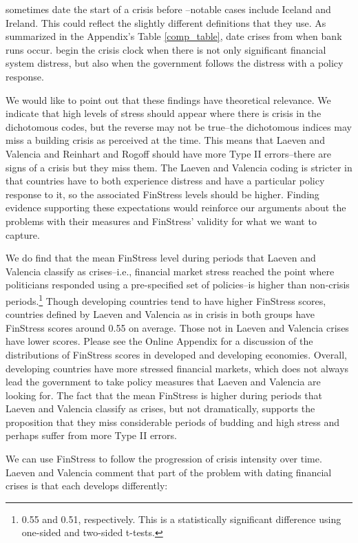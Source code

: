\documentclass[]{article}
\begin{document}
\cite{Reinhart2009} sometimes date the start of a crisis before \cite{laeven2013}--notable cases include Iceland and Ireland. This could reflect the slightly different definitions that they use. As summarized in the Appendix's Table \ref{comp_table}, \cite{Reinhart2009} date crises from when bank runs occur. \cite{laeven2013} begin the crisis clock when there is not only significant financial system distress, but also when the government follows the distress with a policy response.

We would like to point out that these findings have theoretical relevance. We indicate that high levels of stress should appear where there is crisis in the dichotomous codes, but the reverse may not be true--the dichotomous indices may miss a building crisis as perceived at the time. This means that Laeven and Valencia and Reinhart and Rogoff should have more Type II errors--there are signs of a crisis but they miss them. The Laeven and Valencia coding is stricter in that countries have to both experience distress and have a particular policy response to it, so the associated FinStress levels should be higher. Finding evidence supporting these expectations would reinforce our arguments about the problems with their measures and FinStress' validity for what we want to capture.

We do find that the mean FinStress level during periods that Laeven and Valencia classify as crises--i.e., financial market stress reached the point where politicians responded using a pre-specified set of policies--is higher than non-crisis periods.\footnote{0.55 and 0.51, respectively. This is a statistically significant difference using one-sided and two-sided t-tests.} Though developing countries tend to have higher FinStress scores, countries defined by Laeven and Valencia as in crisis in both groups have FinStress scores around 0.55 on average. Those not in Laeven and Valencia crises have lower scores. Please see the Online Appendix for a discussion of the distributions of FinStress scores in developed and developing economies. Overall, developing countries have more stressed financial markets, which does not always lead the government to take policy measures that Laeven and Valencia are looking for. The fact that the mean FinStress is higher during periods that Laeven and Valencia classify as crises, but not dramatically, supports the proposition that they miss considerable periods of budding and high stress and perhaps suffer from more Type II errors.

We can use FinStress to follow the progression of crisis intensity over time. Laeven and Valencia \citeyearpar[227]{laeven2013} comment that part of the problem with dating financial crises is that each develops differently:
\end{document}
